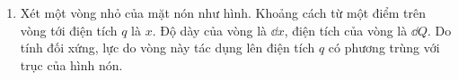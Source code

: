     \begin{loigiai}
        \begin{enumerate}[1)]
        \setlength{\itemsep}{0pt}
            \item 
            Xét một vòng nhỏ của mặt nón như hình. Khoảng cách từ một điểm trên vòng tới điện tích $q$ là $x$. Độ dày của vòng là $\dd x$, điện tích của vòng là $\dd Q$. Do tính đối xứng, lực do vòng này tác dụng lên điện tích $q$ có phương trùng với trục của hình nón.
            \begin{center}
                


\begin{tikzpicture}[x=0.75pt,y=0.75pt,yscale=-1,xscale=1]


\end{tikzpicture}
\end{center}
\end{enumerate}
\end{loigiai}

